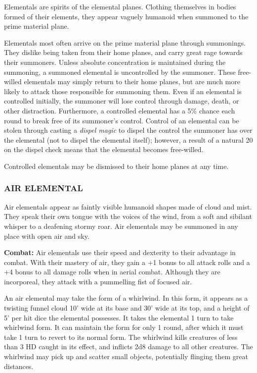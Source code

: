 \begin{multicols}{2}

Elementals are spirits of the elemental planes. Clothing themselves in bodies formed of their elements, they appear vaguely humanoid when summoned to the prime material plane. 

Elementals most often arrive on the prime material plane through summonings. They dislike being taken from their home planes, and carry great rage towards their summoners. Unless absolute concentration is maintained during the summoning, a summoned elemental is uncontrolled by the summoner. These free-willed elementals may simply return to their home planes, but are much more likely to attack those responsible for summoning them. Even if an elemental is controlled initially, the summoner will lose control through damage, death, or other distraction. Furthermore, a controlled elemental has a 5\% chance each round to break free of its summoner's control. Control of an elemental can be stolen through casting a \textit{dispel magic} to dispel the control the summoner has over the elemental (not to dispel the elemental itself); however, a result of a natural 20 on the dispel check means that the elemental becomes free-willed.

Controlled elementals may be dismissed to their home planes at any time.

\subsubsection{AIR ELEMENTAL}

Air elementals appear as faintly visible humanoid shapes made of cloud and mist. They speak their own tongue with the voices of the wind, from a soft and sibilant whisper to a deafening stormy roar. Air elementals may be summoned in any place with open air and sky.

\textbf{Combat:} Air elementals use their speed and dexterity to their advantage in combat. With their mastery of air, they gain a +1 bonus to all attack rolls and a +4 bonus to all damage rolls when in aerial combat. Although they are incorporeal, they attack with a pummelling fist of focused air.

An air elemental may take the form of a whirlwind. In this form, it appears as a twisting funnel cloud 10' wide at its base and 30' wide at its top, and a height of 5' per hit dice the elemental possesses. It takes the elemental 1 turn to take whirlwind form. It can maintain the form for only 1 round, after which it must take 1 turn to revert to its normal form. The whirlwind kills creatures of less than 3 HD caught in its effect, and inflicts 2d8 damage to all other creatures. The whirlwind may pick up and scatter small objects, potentially flinging them great distances.


\end{multicols}
